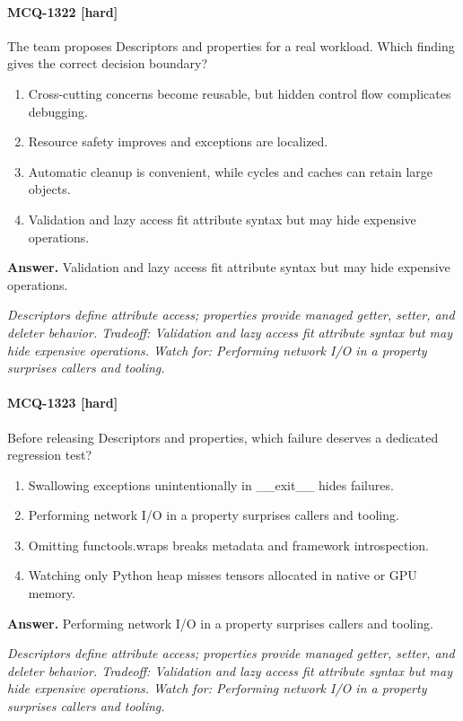 \paragraph{MCQ-1322 [hard]} The team proposes Descriptors and properties for a real workload. Which finding gives the correct decision boundary?
\begin{enumerate}[label=\Alph*.]
\item Cross-cutting concerns become reusable, but hidden control flow complicates debugging.
\item Resource safety improves and exceptions are localized.
\item Automatic cleanup is convenient, while cycles and caches can retain large objects.
\item Validation and lazy access fit attribute syntax but may hide expensive operations.
\end{enumerate}
\noindent\textbf{Answer.} Validation and lazy access fit attribute syntax but may hide expensive operations.
\par\textit{Descriptors define attribute access; properties provide managed getter, setter, and deleter behavior. Tradeoff: Validation and lazy access fit attribute syntax but may hide expensive operations. Watch for: Performing network I/O in a property surprises callers and tooling.}
\paragraph{MCQ-1323 [hard]} Before releasing Descriptors and properties, which failure deserves a dedicated regression test?
\begin{enumerate}[label=\Alph*.]
\item Swallowing exceptions unintentionally in \_\_exit\_\_ hides failures.
\item Performing network I/O in a property surprises callers and tooling.
\item Omitting functools.wraps breaks metadata and framework introspection.
\item Watching only Python heap misses tensors allocated in native or GPU memory.
\end{enumerate}
\noindent\textbf{Answer.} Performing network I/O in a property surprises callers and tooling.
\par\textit{Descriptors define attribute access; properties provide managed getter, setter, and deleter behavior. Tradeoff: Validation and lazy access fit attribute syntax but may hide expensive operations. Watch for: Performing network I/O in a property surprises callers and tooling.}
